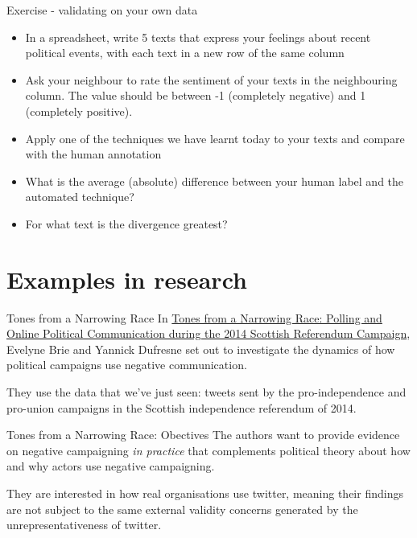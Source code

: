 \documentclass[
  10pt,
  ignorenonframetext,
  aspectratio=169]{beamer}
\providecommand{\tightlist}{%
  \setlength{\itemsep}{0pt}\setlength{\parskip}{0pt}}
\begin{document}
\begin{frame}{Exercise - validating on your own data}
\protect\hypertarget{exercise---validating-on-your-own-data}{}
\begin{itemize}
\tightlist
\item
  In a spreadsheet, write 5 texts that express your feelings about
  recent political events, with each text in a new row of the same
  column
\item
  Ask your neighbour to rate the sentiment of your texts in the
  neighbouring column. The value should be between -1 (completely
  negative) and 1 (completely positive).
\item
  Apply one of the techniques we have learnt today to your texts and
  compare with the human annotation
\item
  What is the average (absolute) difference between your human label and
  the automated technique?
\item
  For what text is the divergence greatest?
\end{itemize}
\end{frame}

\hypertarget{examples-in-research}{%
\section{Examples in research}\label{examples-in-research}}

\begin{frame}{Tones from a Narrowing Race}
\protect\hypertarget{tones-from-a-narrowing-race}{}
In
\href{https://www.cambridge.org/core/journals/british-journal-of-political-science/article/tones-from-a-narrowing-race-polling-and-online-political-communication-during-the-2014-scottish-referendum-campaign/49CEE09374F4729B4C0B7048FBA4521C}{Tones
from a Narrowing Race: Polling and Online Political Communication during
the 2014 Scottish Referendum Campaign}, Evelyne Brie and Yannick
Dufresne set out to investigate the dynamics of how political campaigns
use negative communication.

They use the data that we've just seen: tweets sent by the
pro-independence and pro-union campaigns in the Scottish independence
referendum of 2014.
\end{frame}

\begin{frame}{Tones from a Narrowing Race: Obectives}
\protect\hypertarget{tones-from-a-narrowing-race-obectives}{}
The authors want to provide evidence on negative campaigning \emph{in
practice} that complements political theory about how and why actors use
negative campaigning.

They are interested in how real organisations use twitter, meaning their
findings are not subject to the same external validity concerns
generated by the unrepresentativeness of twitter.
\end{frame}
\end{document}
